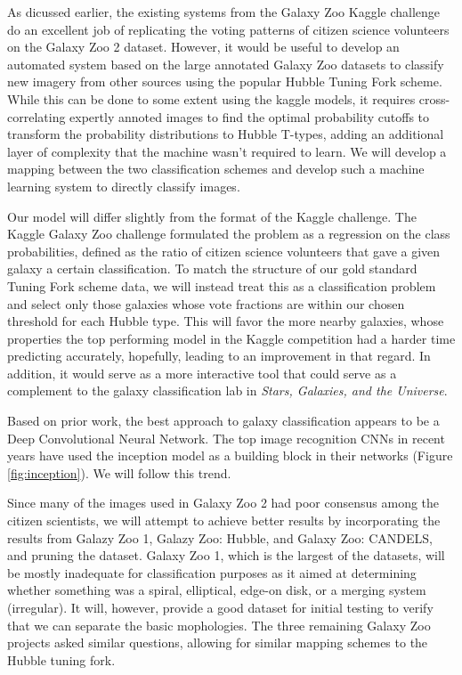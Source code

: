 \documentclass{article}
\begin{document}
As dicussed earlier, the existing systems from the Galaxy Zoo Kaggle challenge do an excellent job of replicating the voting patterns of citizen science volunteers on the Galaxy Zoo 2 dataset. However, it would be useful to develop an automated system based on the large annotated Galaxy Zoo datasets to classify new imagery from other sources using the popular Hubble Tuning Fork scheme. While this can be done to some extent using the kaggle models, it requires cross-correlating expertly annoted images to find the optimal probability cutoffs to transform the probability distributions to Hubble T-types, adding an additional layer of complexity that the machine wasn't required to learn. We will develop a mapping between the two classification schemes and develop such a machine learning system to directly classify images. 

Our model will differ slightly from the format of the Kaggle challenge. The Kaggle Galaxy Zoo challenge formulated the problem as a regression on the class probabilities, defined as the ratio of citizen science volunteers that gave a given galaxy a certain classification. To match the structure of our gold standard Tuning Fork scheme data, we will instead treat this as a classification problem and select only those galaxies whose vote fractions are within our chosen threshold for each Hubble type. This will favor the more nearby galaxies, whose properties the top performing model in the Kaggle competition had a harder time predicting accurately, hopefully, leading to an improvement in that regard. In addition, it would serve as a more interactive tool that could serve as a complement to the galaxy classification lab in \emph{Stars, Galaxies, and the Universe}.

Based on prior work, the best approach to galaxy classification appears to be a Deep Convolutional Neural Network. The top image recognition CNNs in recent years have used the inception model \citep{2014arXiv1409.4842S} as a building block in their networks (Figure \ref{fig:inception}). We will follow this trend.


Since many of the images used in Galaxy Zoo 2 had poor consensus among the citizen scientists, we will attempt to achieve better results by incorporating the results from Galazy Zoo 1, Galazy Zoo: Hubble, and Galaxy Zoo: CANDELS, and pruning the dataset. Galaxy Zoo 1, which is the largest of the datasets, will be mostly inadequate for classification purposes as it aimed at determining whether something was a spiral, elliptical, edge-on disk, or a merging system (irregular). It will, however, provide a good dataset for initial testing to verify that we can separate the basic mophologies. The three remaining Galaxy Zoo projects asked similar questions, allowing for similar mapping schemes to the Hubble tuning fork.
\end{document}
